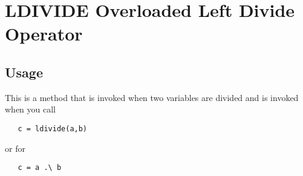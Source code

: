 \section{LDIVIDE Overloaded Left Divide Operator}

\subsection{Usage}

This is a method that is invoked when two variables are divided
and is invoked when you call
\begin{verbatim}
   c = ldivide(a,b)
\end{verbatim}
or for
\begin{verbatim}
   c = a .\ b
\end{verbatim}
